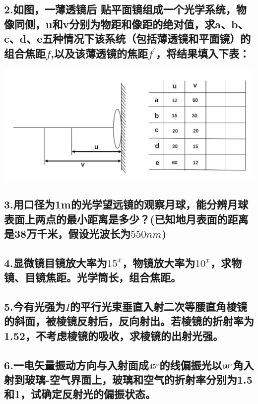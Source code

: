 \documentclass[11pt,a4paper]{article}
\begin{document}
    \subsection*{2.如图，一薄透镜后 贴平面镜组成一个光学系统，物像同侧，u和v分别为物距和像距的绝对值，求a、b、c、d、e五种情况下该系统（包括薄透镜和平面镜）的组合焦距$f$,以及该薄透镜的焦距$f^{'}$，将结果填入下表：}
    \includegraphics[scale=0.2]{1.png}%
    \vspace{10mm}
    \subsection*{3.用口径为1m的光学望远镜的观察月球，能分辨月球表面上两点的最小距离是多少？(已知地月表面的距离是38万千米，假设光波长为$550nm$)}
    \vspace{10mm}
    \subsection*{4.显微镜目镜放大率为$15^{x}$，物镜放大率为$10^{x}$，求物镜、目镜焦距。光学筒长，组合焦距。}
    \vspace{10mm}
    \subsection*{5.今有光强为$I$的平行光束垂直入射二次等腰直角棱镜的斜面，被棱镜反射后，反向射出。若棱镜的折射率为1.52，不考虑棱镜的吸收，求棱镜的出射光强。}
    \vspace{10mm}
    \subsection*{6.一电矢量振动方向与入射面成$45\degree$的线偏振光以$60\degree$角入射到玻璃-空气界面上，玻璃和空气的折射率分别为1.5和1，试确定反射光的偏振状态。}
    \vspace{10mm}
\end{document}
